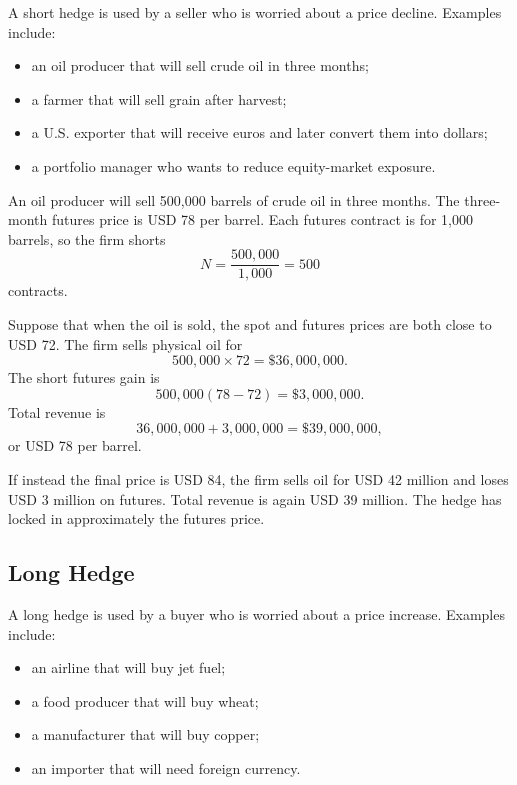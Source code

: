 A short hedge is used by a seller who is worried about a price decline. Examples
include:
\begin{itemize}
    \item an oil producer that will sell crude oil in three months;
    \item a farmer that will sell grain after harvest;
    \item a U.S. exporter that will receive euros and later convert them into
    dollars;
    \item a portfolio manager who wants to reduce equity-market exposure.
\end{itemize}

\begin{exmp}
An oil producer will sell 500,000 barrels of crude oil in three months. The
three-month futures price is USD 78 per barrel. Each futures contract is for
1,000 barrels, so the firm shorts
\[
    N=\frac{500{,}000}{1{,}000}=500
\]
contracts.

Suppose that when the oil is sold, the spot and futures prices are both close to
USD 72. The firm sells physical oil for
\[
    500{,}000\times 72=\$36{,}000{,}000.
\]
The short futures gain is
\[
    500{,}000(78-72)=\$3{,}000{,}000.
\]
Total revenue is
\[
    36{,}000{,}000+3{,}000{,}000=\$39{,}000{,}000,
\]
or USD 78 per barrel.

If instead the final price is USD 84, the firm sells oil for USD 42 million and
loses USD 3 million on futures. Total revenue is again USD 39 million. The hedge
has locked in approximately the futures price.
\end{exmp}

\subsection{Long Hedge}

A long hedge is used by a buyer who is worried about a price increase. Examples
include:
\begin{itemize}
    \item an airline that will buy jet fuel;
    \item a food producer that will buy wheat;
    \item a manufacturer that will buy copper;
    \item an importer that will need foreign currency.
\end{itemize}

